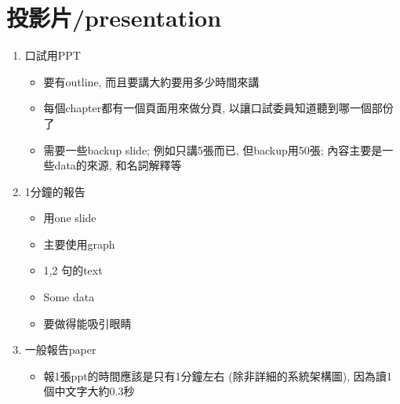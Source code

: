 \section{投影片/presentation}

\begin{enumerate}
  \item
  {
    口試用PPT
    \begin{itemize}
      \item
      {
        要有outline, 而且要講大約要用多少時間來講
      } %

      \item
      {
        每個chapter都有一個頁面用來做分頁, 以讓口試委員知道聽到哪一個部份了
      } %

      \item
      {
        需要一些backup slide; 例如只講5張而已, 但backup用50張; 內容主要是一些data的來源, 和名詞解釋等
      } %
    \end{itemize}
  } %

  \item
  {
      1分鐘的報告
    \begin{itemize}
      \item
      {
        用one slide
      } %

      \item
      {
        主要使用graph
      } %

      \item
      {
        1,2 句的text
      } %

      \item
      {
        Some data
      } %

      \item
      {
        要做得能吸引眼睛
      } %
    \end{itemize}
  } %

  \item
  {
    一般報告paper
    \begin{itemize}
      \item
      {
        報1張ppt的時間應該是只有1分鐘左右 (除非詳細的系統架構圖), 因為讀1個中文字大約0.3秒
      } %


\end{itemize}}
\end{enumerate}
